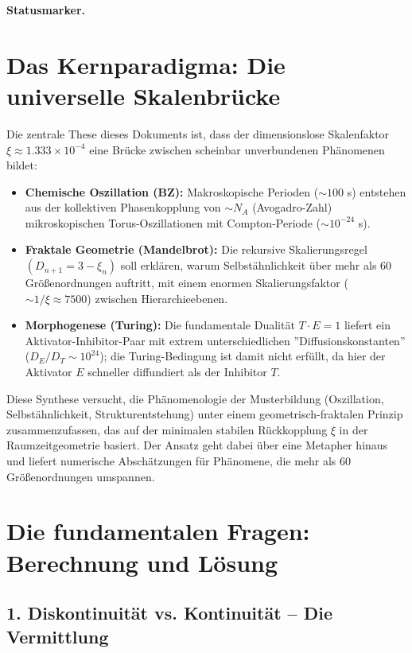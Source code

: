 \medskip\noindent\textbf{Statusmarker.}


\section*{Das Kernparadigma: Die universelle Skalenbrücke}

Die zentrale These dieses Dokuments ist, dass der dimensionslose Skalenfaktor $\xi \approx 1.333 \times 10^{-4}$ eine Brücke zwischen scheinbar unverbundenen Phänomenen bildet:

\begin{itemize}[label=$\bullet$]
	\item \textbf{Chemische Oszillation (BZ):} Makroskopische Perioden ($\sim 100$ s) entstehen aus der kollektiven Phasenkopplung von $\sim N_A$ (Avogadro-Zahl) mikroskopischen Torus-Oszillationen mit Compton-Periode ($\sim 10^{-24}$ s).
	
	\item \textbf{Fraktale Geometrie (Mandelbrot):} Die rekursive Skalierungsregel $(D_{n+1} = 3 - \xi_n)$ soll erklären, warum Selbstähnlichkeit über mehr als 60 Größenordnungen auftritt, mit einem enormen Skalierungsfaktor ($\sim 1/\xi \approx 7500$) zwischen Hierarchieebenen.
	
	\item \textbf{Morphogenese (Turing):} Die fundamentale Dualität $T \cdot E = 1$ liefert ein Aktivator-Inhibitor-Paar mit extrem unterschiedlichen ''Diffusionskonstanten'' ($D_E/D_T \sim 10^{24}$); die Turing-Bedingung ist damit nicht erfüllt, da hier der Aktivator $E$ schneller diffundiert als der Inhibitor $T$.
\end{itemize}

Diese Synthese versucht, die Phänomenologie der Musterbildung (Oszillation, Selbstähnlichkeit, Strukturentstehung) unter einem geometrisch-fraktalen Prinzip zusammenzufassen, das auf der minimalen stabilen Rückkopplung $\xi$ in der Raumzeitgeometrie basiert. Der Ansatz geht dabei über eine Metapher hinaus und liefert numerische Abschätzungen für Phänomene, die mehr als 60 Größenordnungen umspannen.

\section*{Die fundamentalen Fragen: Berechnung und Lösung}

\subsection*{1. Diskontinuität vs. Kontinuität – Die Vermittlung}

